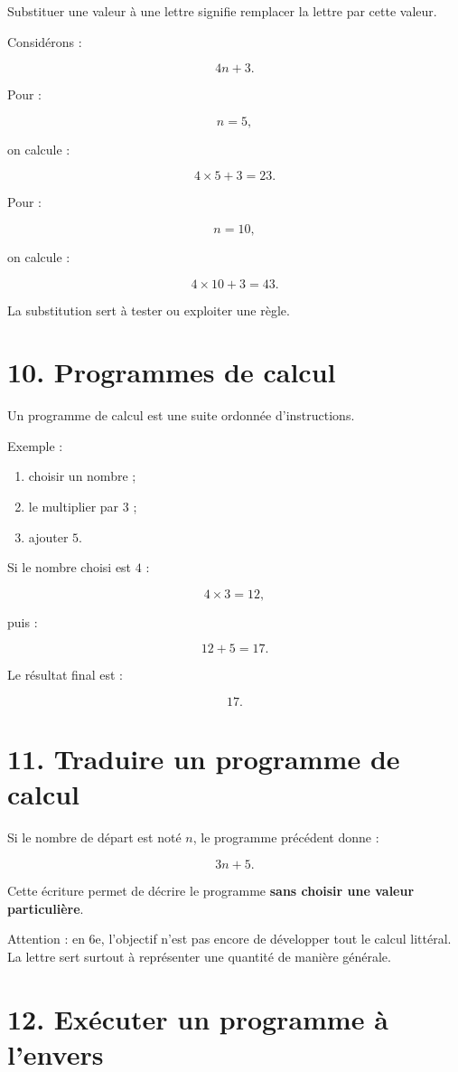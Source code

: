 Substituer une valeur à une lettre signifie remplacer la lettre par cette valeur.

Considérons :

\[
4n+3.
\]

Pour :

\[
n=5,
\]

on calcule :

\[
4\times5+3=23.
\]

Pour :

\[
n=10,
\]

on calcule :

\[
4\times10+3=43.
\]

La substitution sert à tester ou exploiter une règle.

\section{10. Programmes de calcul}

Un programme de calcul est une suite ordonnée d’instructions.

Exemple :

\begin{enumerate}
\item choisir un nombre ;
\item le multiplier par $3$ ;
\item ajouter $5$.
\end{enumerate}

Si le nombre choisi est $4$ :

\[
4\times3=12,
\]

puis :

\[
12+5=17.
\]

Le résultat final est :

\[
17.
\]

\section{11. Traduire un programme de calcul}

Si le nombre de départ est noté $n$, le programme précédent donne :

\[
3n+5.
\]

Cette écriture permet de décrire le programme \textbf{sans choisir une valeur particulière}.

Attention : en 6e, l’objectif n’est pas encore de développer tout le calcul littéral. La lettre sert surtout à représenter une quantité de manière générale.

\section{12. Exécuter un programme à l’envers}

